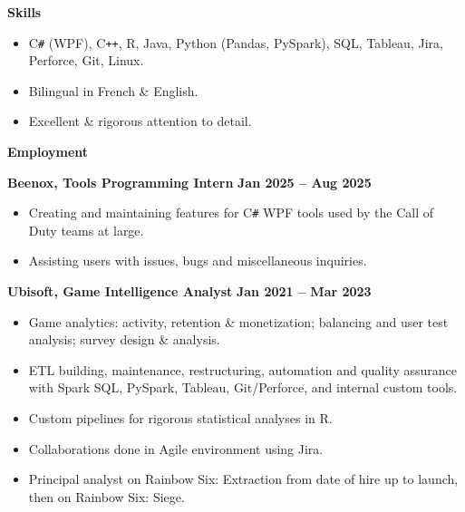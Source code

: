 \documentclass[11pt, oneside]{article}   	%
\begin{document}
\vspace{12pt}

\textbf{\large{Skills}}
\small \vspace{-4pt}
\begin{itemize}
\item C\texttt{\#} (WPF), C\texttt{++}, R, Java, Python (Pandas, PySpark), SQL, Tableau, Jira, Perforce, Git, Linux.
\vspace{-4pt}
\item Bilingual in French \& English.
\vspace{-4pt}
\item Excellent \& rigorous attention to detail.
\end{itemize}

\vspace{12pt}

\textbf{\large{Employment}}
\small 

\vspace{8pt}

\textbf{Beenox, Tools Programming Intern} \hfill \textbf{Jan 2025 -- Aug 2025}
\begin{itemize}
\item Creating and maintaining features for C\texttt{\#} WPF tools used by the Call of Duty teams at large.
\vspace{-4pt}
\item Assisting users with issues, bugs and miscellaneous inquiries.
\end{itemize}

\vspace{4pt}

\textbf{Ubisoft, Game Intelligence Analyst} \hfill \textbf{Jan 2021 -- Mar 2023}
\vspace{-4pt}
\begin{itemize}
\item Game analytics: activity, retention \& monetization; balancing and user test analysis; survey design \& analysis.
\vspace{-14pt}
\item ETL building, maintenance, restructuring, automation and quality assurance with Spark SQL, PySpark, Tableau, Git/Perforce, and internal custom tools.
\vspace{-4pt}
\item Custom pipelines for rigorous statistical analyses in R.
\vspace{-4pt}
\item Collaborations done in Agile environment using Jira.
\vspace{-4pt}
\item Principal analyst on Rainbow Six: Extraction from date of hire up to launch, then on Rainbow Six: Siege.
\end{itemize}
\end{document}
